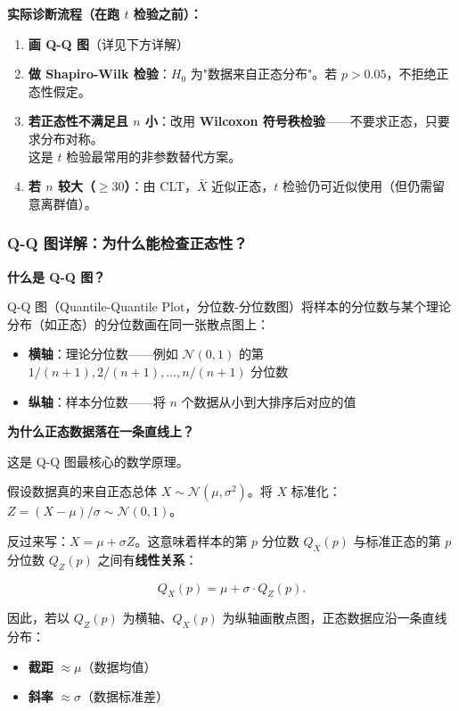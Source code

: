 \medskip
\textbf{实际诊断流程（在跑 $t$ 检验之前）：}

\begin{enumerate}[label=(\arabic*)]
    \item \textbf{画 Q-Q 图}（详见下方详解）
    \item \textbf{做 Shapiro-Wilk 检验}：$H_0$ 为"数据来自正态分布"。若 $p > 0.05$，不拒绝正态性假定。
    \item \textbf{若正态性不满足且 $n$ 小}：改用 \textbf{Wilcoxon 符号秩检验}——不要求正态，只要求分布对称。\\
    这是 $t$ 检验最常用的非参数替代方案。
    \item \textbf{若 $n$ 较大（$\ge 30$）}：由 CLT，$\bar{X}$ 近似正态，$t$ 检验仍可近似使用（但仍需留意离群值）。
\end{enumerate}

\subsubsection{Q-Q 图详解：为什么能检查正态性？}

\textbf{什么是 Q-Q 图？}

Q-Q 图（Quantile-Quantile Plot，分位数-分位数图）将样本的分位数与某个理论分布（如正态）的分位数画在同一张散点图上：

\begin{itemize}
    \item \textbf{横轴}：理论分位数——例如 $\mathcal{N}(0,1)$ 的第 $1/(n+1), 2/(n+1), \dots, n/(n+1)$ 分位数
    \item \textbf{纵轴}：样本分位数——将 $n$ 个数据从小到大排序后对应的值
\end{itemize}

\textbf{为什么正态数据落在一条直线上？}

这是 Q-Q 图最核心的数学原理。

假设数据真的来自正态总体 $X \sim \mathcal{N}(\mu, \sigma^2)$。将 $X$ 标准化：$Z = (X - \mu)/\sigma \sim \mathcal{N}(0,1)$。

反过来写：$X = \mu + \sigma Z$。这意味着样本的第 $p$ 分位数 $Q_X(p)$ 与标准正态的第 $p$ 分位数 $Q_Z(p)$ 之间有\textbf{线性关系}：

\begin{equation}
    \boxed{Q_X(p) = \mu + \sigma \cdot Q_Z(p)}.
\end{equation}

因此，若以 $Q_Z(p)$ 为横轴、$Q_X(p)$ 为纵轴画散点图，正态数据应沿一条直线分布：
\begin{itemize}
    \item \textbf{截距} $\approx \mu$（数据均值）
    \item \textbf{斜率} $\approx \sigma$（数据标准差）
\end{itemize}

